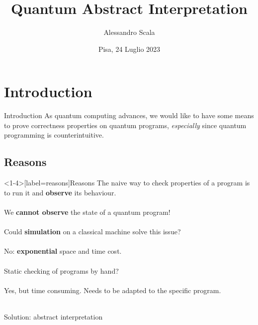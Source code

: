 \documentclass[11pt,svgnames,smaller,aspectratio=43,english]{beamer}
\title{Quantum Abstract Interpretation}
\author{Alessandro Scala}
\institute[Università di Pisa]{Università di Pisa\\Dipartimento di Informatica}
\date{Pisa, 24 Luglio 2023}
\begin{document}
\begin{frame} 
	\titlepage
\end{frame}





\section{Introduction}
\begin{frame}{Introduction}
	As quantum computing advances, we would like to have some means to prove correctness properties on quantum programs, \emph{especially} since quantum programming is counterintuitive.\\
\end{frame}

\subsection{Reasons}
\begin{frame}<1-4>[label=reasons]{Reasons}
	The naive way to check properties of a program is to run it and \textbf<2->{observe} its behaviour.\\\;\\
	\pause
	\alert{We \textbf{cannot observe} the state of a quantum program!}\\\;\\
	\pause
	Could \textbf{simulation} on a classical machine solve this issue?\\\;\\
	\pause
	\alert{No: \textbf{exponential} space and time cost.}\\\;\\
	\pause
	Static checking of programs by hand?\\\;\\
	\pause
	{\color{orange} Yes, but time consuming. Needs to be adapted to the specific program.}\\\;\\
	\pause
	\begin{center}
		\large \color{blue} Solution: abstract interpretation
	\end{center}
\end{frame}
\end{document}
